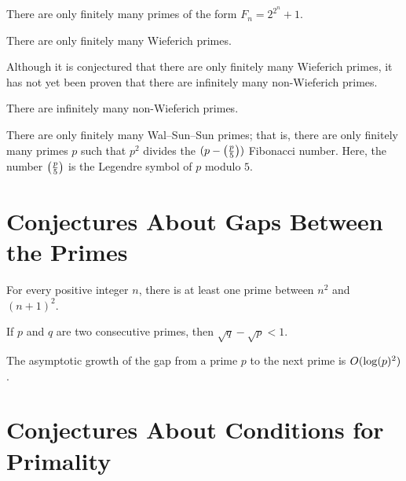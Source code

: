 \begin{conjecture}
  There are only finitely many primes of the form $F_n=2^{2^n}+1$.
\end{conjecture}

\begin{conjecture}
  There are only finitely many Wieferich primes.
\end{conjecture}

Although it is conjectured that there are only finitely many Wieferich primes, it has not yet been proven that there are infinitely many non-Wieferich primes.

\begin{conjecture}
  There are infinitely many non-Wieferich primes.
\end{conjecture}

\begin{conjecture}
  There are only finitely many Wal--Sun--Sun primes; that is, there are only finitely many primes $p$ such that $p^2$ divides the $(p- \legendre{p}{5})$\supth{} Fibonacci number. Here, the number $\legendre{p}{5}$ is the Legendre symbol of $p$ modulo $5$.
\end{conjecture}

\section{Conjectures About Gaps Between the Primes}

\begin{conjecture}\label{conjecture:legendre}
  For every positive integer $n$, there is at least one prime between $n^2$ and $(n+1)^2$.
\end{conjecture}

\begin{conjecture}
  If $p$ and $q$ are two consecutive primes, then $\sqrt{q}-\sqrt{p}<1$.
\end{conjecture}

\begin{conjecture}
  The asymptotic growth of the gap from a prime $p$ to the next prime is $O(\log(p)^2)$.
\end{conjecture}

\section{Conjectures About Conditions for Primality}

